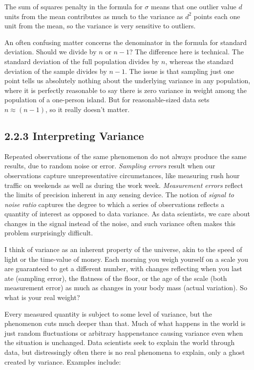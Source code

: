\documentclass[10pt]{article}
\begin{document}
The sum of squares penalty in the formula for \(\sigma\) means that one outlier value \(d\) units from the mean contributes as much to the variance as \(d^{2}\) points each one unit from the mean, so the variance is very sensitive to outliers.

An often confusing matter concerns the denominator in the formula for standard deviation. Should we divide by \(n\) or \(n-1\)? The difference here is technical. The standard deviation of the full population divides by \(n\), whereas the standard deviation of the sample divides by \(n-1\). The issue is that sampling just one point tells us absolutely nothing about the underlying variance in any population, where it is perfectly reasonable to say there is zero variance in weight among the population of a one-person island. But for reasonable-sized data sets \(n \approx(n-1)\), so it really doesn't matter.

\subsection*{2.2.3 Interpreting Variance}
Repeated observations of the same phenomenon do not always produce the same results, due to random noise or error. \textit{Sampling errors} result when our observations capture unrepresentative circumstances, like measuring rush hour traffic on weekends as well as during the work week. \textit{Measurement errors} reflect the limits of precision inherent in any sensing device. The notion of \textit{signal to noise ratio} captures the degree to which a series of observations reflects a quantity of interest as opposed to data variance. As data scientists, we care about changes in the signal instead of the noise, and such variance often makes this problem surprisingly difficult.

I think of variance as an inherent property of the universe, akin to the speed of light or the time-value of money. Each morning you weigh yourself on a scale you are guaranteed to get a different number, with changes reflecting when you last ate (sampling error), the flatness of the floor, or the age of the scale (both measurement error) as much as changes in your body mass (actual variation). So what is your real weight?

Every measured quantity is subject to some level of variance, but the phenomenon cuts much deeper than that. Much of what happens in the world is just random fluctuations or arbitrary happenstance causing variance even when the situation is unchanged. Data scientists seek to explain the world through data, but distressingly often there is no real phenomena to explain, only a ghost created by variance. Examples include:
\end{document}
